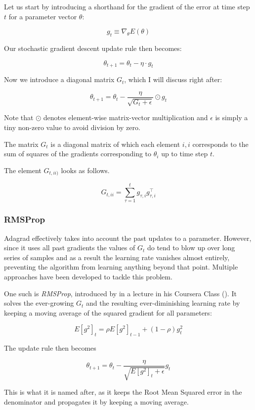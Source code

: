 Let us start by introducing a shorthand for
the gradient of the error at time step $t$
for a parameter vector $\theta$:

\begin{equation}
  g_{t} \equiv \nabla_\theta E(\theta)
\end{equation}

Our stochastic gradient descent update rule then becomes:

\begin{equation}
  \theta_{t+1} = \theta_{t} - \eta \cdot g_{t}
\end{equation}

Now we introduce a diagonal matrix $G_t$,
which I will discuss right after:

\begin{equation}
  \theta_{t+1} = \theta_{t} - \frac{\eta}{\sqrt{G_t + \epsilon}} \odot g_{t}
\end{equation}

Note that $\odot$ denotes element-wise matrix-vector multiplication
and $\epsilon$ is simply a tiny non-zero value
to avoid division by zero.

The matrix $G_t$ is a diagonal matrix
of which each element $i,i$
corresponds to the sum of squares of the gradients
corresponding to $\theta_i$
up to time step $t$.

The element $G_{t, ii)}$ looks as follows.

\begin{equation}
  G_{t, ii} = \sum^t_{\tau=1}g_{\tau, i} g_{\tau, i}^\top
\end{equation}

\subsubsection{RMSProp}
Adagrad effectively takes into account
the past updates to a parameter.
However, since it uses all past gradients
the values of $G_t$ do tend to blow up over long
series of samples
and as a result the learning rate vanishes almost entirely,
preventing the algorithm from learning anything beyond that point.
Multiple approaches have been developed to tackle this problem.

One such is \textit{RMSProp},
introduced by \citeauthor{hinton2012neural}
in a lecture in his Coursera Class (\citeyear{hinton2012neural}).
It solves the ever-growing $G_t$
and the resulting ever-diminishing learning rate
by keeping a moving average of the squared gradient for all parameters:

\begin{equation}
  E[g^2]_t = \rho E[g^2]_{t-1} + (1-\rho) g^2_t
\end{equation}

The update rule then becomes

\begin{equation}
  \label{eq:rmsprop}
  \theta_{t+1} = \theta_{t} - \frac{\eta}{\sqrt{E[g^2]_t + \epsilon}} g_{t}
\end{equation}

This is what it is named after,
as it keeps the Root Mean Squared error in the denominator
and propagates it by keeping a moving average.
